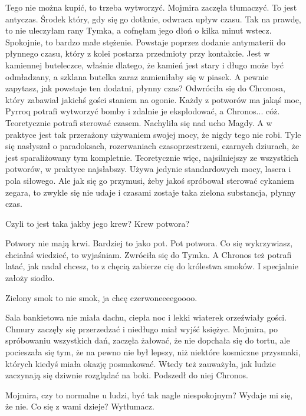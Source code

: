 \ds{} Tego nie można kupić, to trzeba wytworzyć. \dm{} Mojmira zaczęła tłumaczyć. \dm{} To jest antyczas. Środek który, gdy się go dotknie, odwraca upływ czasu. 
Tak na prawdę, to nie uleczyłam rany Tymka, a cofnęłam jego dłoń o kilka minut wstecz. Spokojnie, to bardzo małe stężenie.
Powstaje poprzez dodanie antymaterii do płynnego czasu, który z kolei postarza przedmioty przy kontakcie. 
Jest w kamiennej buteleczce, właśnie dlatego, że kamień jest stary i długo może być odmładzany, a szklana butelka zaraz zamieniłaby się w piasek.
A pewnie zapytasz, jak powstaje ten dodatni, płynny czas? 
\dm{} Odwróciła się do Chronosa, który zabawiał jakichś gości staniem na ogonie. \dm{} 
Każdy z potworów ma jakąś moc, Pyrroq potrafi wytworzyć bomby i zdalnie je eksplodować, a Chronos... cóż. Teoretycznie potrafi sterować czasem.
\dm{} Nachyliła się nad ucho Magdy. \dm{} A w praktyce jest tak przerażony używaniem swojej mocy, że nigdy tego nie robi.
Tyle się nasłyszał o paradoksach, rozerwaniach czasoprzestrzeni, czarnych dziurach, że jest sparaliżowany tym kompletnie.
Teoretycznie więc, najsilniejszy ze wszystkich potworów, w praktyce najsłabszy.
Używa jedynie standardowych mocy, lasera i pola siłowego.
Ale jak się go przymusi, żeby jakoś spróbował sterować cykaniem zegara, to zwykle się nie udaje i czasami zostaje taka zielona substancja, płynny czas. \de{}

\ds{} Czyli to jest taka jakby jego krew? Krew potwora? \de{}

\ds{} Potwory nie mają krwi. Bardziej to jako pot. Pot potwora. Co się wykrzywiasz, chciałaś wiedzieć, to wyjaśniam. \dm{} Zwróciła się do Tymka. \dm{}
A Chronos też potrafi latać, jak nadal chcesz, to z chęcią zabierze cię do królestwa smoków. I specjalnie założy siodło. \de{}

\ds{} Zielony smok to nie smok, ja chcę czerwoneeeegoooo. \de{}

\divider{}

Sala bankietowa nie miała dachu, ciepła noc i lekki wiaterek orzeźwiały gości.
Chmury zaczęły się przerzedzać i niedługo miał wyjść księżyc.
Mojmira, po spróbowaniu wszystkich dań, zaczęła żałować, że nie dopchała się do tortu, ale pocieszała się tym, 
że na pewno nie był lepszy, niż niektóre kosmiczne przysmaki, których kiedyś miała okazję posmakować.
Wtedy też zauważyła, jak ludzie zaczynają się dziwnie rozglądać na boki. 
Podszedł do niej Chronos.

\ds{} Mojmira, czy to normalne u ludzi, być tak nagle niespokojnym? Wydaje mi się, że nie. Co się z wami dzieje? Wytłumacz. \de{}

